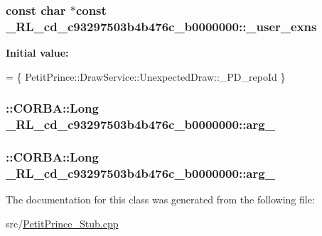 \subsubsection[{\texorpdfstring{\+\_\+user\+\_\+exns}{_user_exns}}]{\setlength{\rightskip}{0pt plus 5cm}const char $\ast$const \+\_\+R\+L\+\_\+cd\+\_\+c93297503b4b476c\+\_\+b0000000\+::\+\_\+user\+\_\+exns\hspace{0.3cm}{\ttfamily [static]}}\hypertarget{class__0_r_l__cd__c93297503b4b476c__b0000000_a03a219aaf4b2d7bcc60274a72583f9d8}{}\label{class__0_r_l__cd__c93297503b4b476c__b0000000_a03a219aaf4b2d7bcc60274a72583f9d8}
{\bfseries Initial value\+:}
\begin{DoxyCode}
= \{
  PetitPrince::DrawService::UnexpectedDraw::\_PD\_repoId
\}
\end{DoxyCode}
\subsubsection[{\texorpdfstring{arg\+\_\+0}{arg_0}}]{\setlength{\rightskip}{0pt plus 5cm}\+::C\+O\+R\+B\+A\+::\+Long \+\_\+R\+L\+\_\+cd\+\_\+c93297503b4b476c\+\_\+b0000000\+::arg\+\_}\hypertarget{class__0_r_l__cd__c93297503b4b476c__b0000000_ae90df0f02cbdd0ef4f1add610ebd2118}{}\label{class__0_r_l__cd__c93297503b4b476c__b0000000_ae90df0f02cbdd0ef4f1add610ebd2118}
\subsubsection[{\texorpdfstring{arg\+\_\+1}{arg_1}}]{\setlength{\rightskip}{0pt plus 5cm}\+::C\+O\+R\+B\+A\+::\+Long \+\_\+R\+L\+\_\+cd\+\_\+c93297503b4b476c\+\_\+b0000000\+::arg\+\_}\hypertarget{class__0_r_l__cd__c93297503b4b476c__b0000000_a02271bbb9282eb05747774e2e14e7ffb}{}\label{class__0_r_l__cd__c93297503b4b476c__b0000000_a02271bbb9282eb05747774e2e14e7ffb}


The documentation for this class was generated from the following file\+:\begin{DoxyCompactItemize}
\item 
src/\hyperlink{_petit_prince___stub_8cpp}{Petit\+Prince\+\_\+\+Stub.\+cpp}\end{DoxyCompactItemize}
